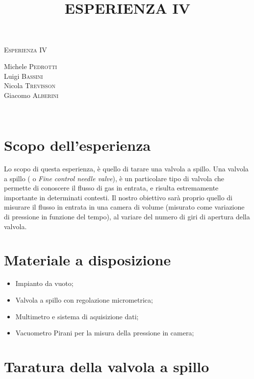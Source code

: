 \documentclass[11pt]{article}
\begin{document}
\begin{center}

\textsc{\Huge Esperienza IV}\\[0.5cm]


\large
\title{ESPERIENZA IV}
 
Michele \textsc{Pedrotti}\\
Luigi \textsc{Bassini}\\
Nicola \textsc{Trevisson}\\
Giacomo \textsc{Alberini}

\end{center}


~\\

\section{Scopo dell'esperienza}
Lo scopo di questa esperienza, è quello di tarare una valvola a spillo. Una valvola a spillo ( o \textit{Fine control needle valve}), è un particolare tipo di valvola che permette di conoscere il flusso di gas in entrata, e risulta estremamente importante in determinati contesti. Il nostro obiettivo sarà proprio quello di misurare il flusso in entrata in una camera di volume (misurato come variazione di pressione in funzione del tempo), al variare del numero di giri di apertura della valvola.
\section{Materiale a disposizione}
\begin{itemize}
\item Impianto da vuoto;
\item Valvola a spillo con regolazione micrometrica;
\item Multimetro e sistema di aquisizione dati;
\item Vacuometro Pirani per la misura della pressione in camera;
\end{itemize}

\section{Taratura della valvola a spillo}
\end{document}
